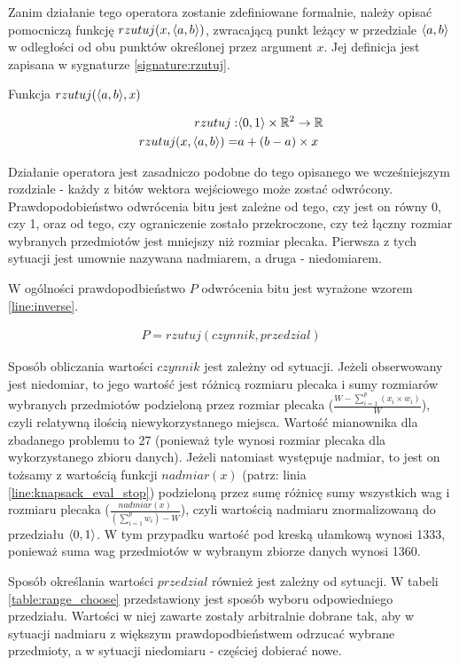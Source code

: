 \documentclass[./FM_mgr.tex]{subfiles}
\begin{document}
Zanim działanie tego operatora zostanie zdefiniowane formalnie, należy opisać pomocniczą funkcję $rzutuj(x, \langle a, b\rangle)$, zwracającą punkt leżący w przedziale $\langle a, b\rangle$ w odległości od obu punktów określonej przez argument $x$.
Jej definicja jest zapisana w sygnaturze \ref{signature:rzutuj}.

\begin{signature}
	\caption{Funkcja $rzutuj(\langle a, b\rangle, x)$ \label{signature:rzutuj}}
	\begin{align}
	rzutuj: &\langle0, 1\rangle \times \mathbb{R}^2 \rightarrow \mathbb{R} \\
	rzutuj(x, \langle a, b\rangle) =& a + (b-a) \times x
	\end{align}
\end{signature}

Działanie operatora jest zasadniczo podobne do tego opisanego we wcześniejszym rozdziale - każdy z bitów wektora wejściowego może zostać odwrócony.
Prawdopodobieństwo odwrócenia bitu jest zależne od tego, czy jest on równy 0, czy 1, oraz od tego, czy ograniczenie zostało przekroczone, czy też łączny rozmiar wybranych przedmiotów jest mniejszy niż rozmiar plecaka.
Pierwsza z tych sytuacji jest umownie nazywana nadmiarem, a druga - niedomiarem.

W ogólności prawdopodbieństwo $P$ odwrócenia bitu jest wyrażone wzorem \ref{line:inverse}.

\begin{align}
\label{line:inverse}
P = rzutuj(czynnik, przedzial)
\end{align}

Sposób obliczania wartości $czynnik$ jest zależny od sytuacji. 
Jeżeli obserwowany jest niedomiar, to jego wartość jest różnicą rozmiaru plecaka i sumy rozmiarów wybranych przedmiotów podzieloną przez rozmiar plecaka ($\frac{W - \sum_{i=1}^p (x_i \times w_i)}{W}$), czyli relatywną ilością niewykorzystanego miejsca. Wartość mianownika dla zbadanego problemu to 27 (ponieważ tyle wynosi rozmiar plecaka dla wykorzystanego zbioru danych).
Jeżeli natomiast występuje nadmiar, to jest on tożsamy z wartością funkcji $nadmiar(x)$ (patrz: linia \ref{line:knapsack_eval_stop}) podzieloną przez sumę różnicę sumy wszystkich wag i rozmiaru plecaka ($\frac{nadmiar(x)}{(\sum_{i=1}^p w_i) - W}$), czyli wartością nadmiaru znormalizowaną do przedziału $\langle0, 1\rangle$.
W tym przypadku wartość pod kreską ułamkową wynosi 1333, ponieważ suma wag przedmiotów w wybranym zbiorze danych wynosi 1360.

Sposób określania wartości $przedzial$ również jest zależny od sytuacji. 
W tabeli \ref{table:range_choose} przedstawiony jest sposób wyboru odpowiedniego przedziału. 
Wartości w niej zawarte zostały arbitralnie dobrane tak, aby w sytuacji nadmiaru z większym prawdopodbieństwem odrzucać wybrane przedmioty, a w sytuacji niedomiaru - częściej dobierać nowe.
\end{document}
